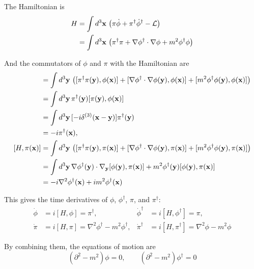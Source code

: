 \documentclass[a4paper,11pt]{article}
\begin{document}
The Hamiltonian is
\begin{align}
    H &= \int d^3\mathbf{x}\, \left(\pi\dot{\phi} + \pi^\dagger\dot{\phi}^\dagger - \mathcal{L}\right) \notag\\
    &= \int d^3\mathbf{x}\, \left(\pi^\dagger\pi + \nabla\phi^\dagger\cdot\nabla\phi + m^2\phi^\dagger\phi\right)
\end{align}

And the commutators of $\phi$ and $\pi$ with the Hamiltonian are
\begin{align}
    [H, \phi(\mathbf{x})] &= \int d^3\mathbf{y}\, \left([\pi^\dagger\pi(\mathbf{y}), \phi(\mathbf{x})] + [\nabla\phi^\dagger\cdot\nabla\phi(\mathbf{y}), \phi(\mathbf{x})] + [m^2\phi^\dagger\phi(\mathbf{y}), \phi(\mathbf{x})]\right) \notag\\
    &= \int d^3\mathbf{y}\, \pi^\dagger(\mathbf{y})[\pi(\mathbf{y}), \phi(\mathbf{x})] \notag\\
    &=\int d^3\mathbf{y}\, [-i\delta^{(3)}(\mathbf{x}-\mathbf{y})]\pi^\dagger(\mathbf{y}) \\
    &= -i\pi^\dagger(\mathbf{x}),\\
    [H, \pi(\mathbf{x})] &= \int d^3\mathbf{y}\, \left([\pi^\dagger\pi(\mathbf{y}), \pi(\mathbf{x})] + [\nabla\phi^\dagger\cdot\nabla\phi(\mathbf{y}), \pi(\mathbf{x})] + [m^2\phi^\dagger\phi(\mathbf{y}), \pi(\mathbf{x})]\right) \notag\\
    &=\int d^3\mathbf{y}\, \nabla\phi^\dagger(\mathbf{y})\cdot\nabla_{\mathbf{y}}[\phi(\mathbf{y}),\pi(\mathbf{x})]+ m^2\phi^{\dagger}(\mathbf{y})[\phi(\mathbf{y}), \pi(\mathbf{x})]\\
    &= -i\nabla^2\phi^\dagger(\mathbf{x}) + im^2\phi^\dagger(\mathbf{x})
\end{align}

This gives the time derivatives of $\phi$, $\phi^\dagger$, $\pi$, and $\pi^\dagger$:
\begin{align}
    \dot{\phi} &= i[H, \phi] = \pi^\dagger, & \dot{\phi}^\dagger &= i[H, \phi^\dagger] = \pi,\\
    \dot{\pi} &= i[H, \pi] = \nabla^2\phi^\dagger - m^2\phi^\dagger, & \dot{\pi}^\dagger &= i[H, \pi^\dagger] = \nabla^2\phi - m^2\phi
\end{align}

By combining them, the equations of motion are
\begin{equation}
    (\partial^2 - m^2)\phi = 0, \qquad (\partial^2 - m^2)\phi^\dagger = 0
\end{equation}
\end{document}
